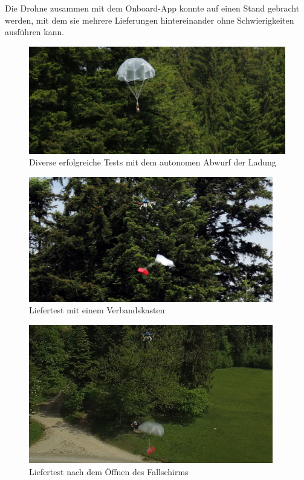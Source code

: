 Die Drohne zusammen mit dem Onboard-App konnte auf einen Stand gebracht werden, mit dem sie mehrere Lieferungen hintereinander ohne Schwierigkeiten ausführen kann.

\begin{figure}[H]
	\centering
	\includegraphics[width=1.0\textwidth] {images/parachute-test.jpeg}
	\caption{Diverse erfolgreiche Tests mit dem autonomen Abwurf der Ladung}
\end{figure}

\begin{figure}[H]
	\centering
	\includegraphics[width=0.95\textwidth] {images/drone-drop.jpg}
	\caption{Liefertest mit einem Verbandskasten}
\end{figure}
\begin{figure}[H]
	\centering
	\includegraphics[width=0.95\textwidth] {images/drone-drop2.jpg}
	\caption{Liefertest nach dem Öffnen des Fallschirms}
\end{figure}


